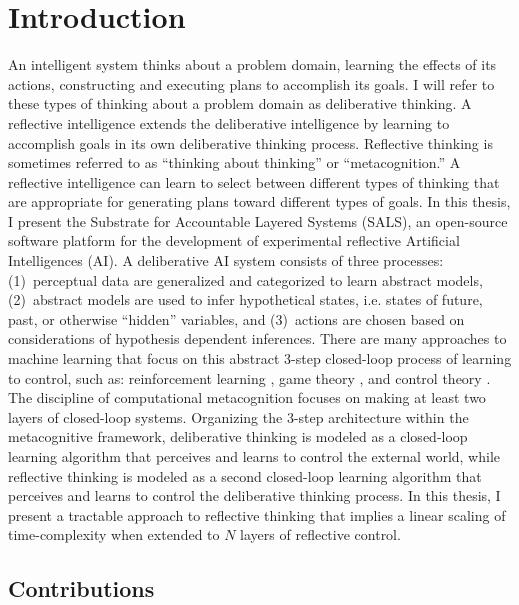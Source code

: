 \chapter{Introduction}
\label{chapter:introduction}

An intelligent system thinks about a problem domain, learning the
effects of its actions, constructing and executing plans to accomplish
its goals.  I will refer to these types of thinking about a problem
domain as deliberative thinking.  A reflective intelligence extends
the deliberative intelligence by learning to accomplish goals in its
own deliberative thinking process.  Reflective thinking is sometimes
referred to as ``thinking about thinking'' or ``metacognition.''  A
reflective intelligence can learn to select between different types of
thinking that are appropriate for generating plans toward different
types of goals.  In this thesis, I present the Substrate for
Accountable Layered Systems (SALS), an open-source software platform
for the development of experimental reflective Artificial
Intelligences (AI).  A deliberative AI system consists of three
processes: {\mbox{(1)~perceptual}} data are generalized and
categorized to learn abstract models, {\mbox{(2)~abstract}} models are
used to infer hypothetical states, i.e. states of future, past, or
otherwise ``hidden'' variables, and {\mbox{(3)~actions}} are chosen
based on considerations of hypothesis dependent inferences.  There are
many approaches to machine learning that focus on this abstract 3-step
closed-loop process of learning to control, such as: reinforcement
learning \cite[]{kaelbling:1996,dvzeroski:2001}, game theory
\cite[]{bowling:2000,rapoport:2001}, and control theory
\cite[]{simon:1982, bertsekas:1995}.  The discipline of computational
metacognition \cite[]{cox_and_raja:2008,cox:2010} focuses on making at
least two layers of closed-loop systems.  Organizing the 3-step
architecture within the metacognitive framework, deliberative thinking
is modeled as a closed-loop learning algorithm that perceives and
learns to control the external world, while reflective thinking is
modeled as a second closed-loop learning algorithm that perceives and
learns to control the deliberative thinking process.  In this thesis,
I present a tractable approach to reflective thinking that implies a
linear scaling of time-complexity when extended to $N$ layers of
reflective control.

\section{Contributions}

